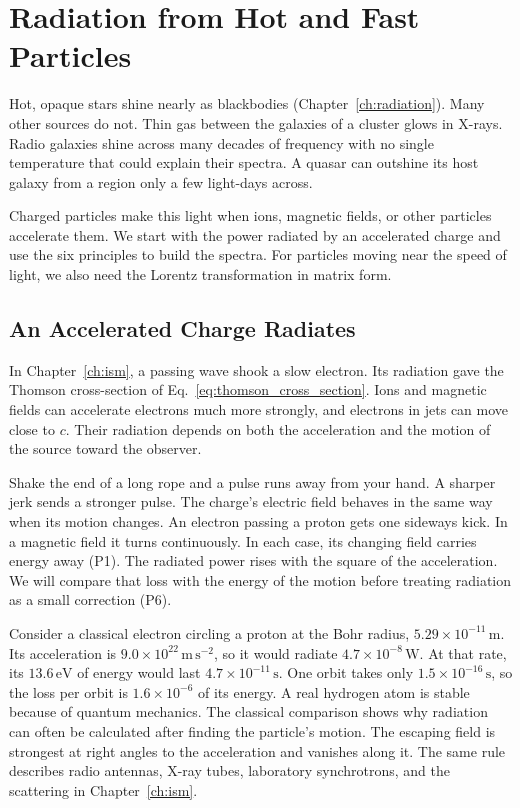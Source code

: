 \chapter{Radiation from Hot and Fast Particles}
\label{ch:fastparticles}



Hot, opaque stars shine nearly as blackbodies (Chapter~\ref{ch:radiation}). Many other sources do not. Thin gas between the galaxies of a cluster glows in X-rays. Radio galaxies shine across many decades of frequency with no single temperature that could explain their spectra. A quasar can outshine its host galaxy from a region only a few light-days across.

Charged particles make this light when ions, magnetic fields, or other particles accelerate them. We start with the power radiated by an accelerated charge and use the six principles to build the spectra. For particles moving near the speed of light, we also need the Lorentz transformation in matrix form.

\section{An Accelerated Charge Radiates}
\label{fp:sec:larmor}

In Chapter~\ref{ch:ism}, a passing wave shook a slow electron. Its radiation gave the Thomson cross-section of Eq.~\eqref{eq:thomson_cross_section}. Ions and magnetic fields can accelerate electrons much more strongly, and electrons in jets can move close to $c$. Their radiation depends on both the acceleration and the motion of the source toward the observer.

Shake the end of a long rope and a pulse runs away from your hand. A sharper jerk sends a stronger pulse. The charge's electric field behaves in the same way when its motion changes. An electron passing a proton gets one sideways kick. In a magnetic field it turns continuously. In each case, its changing field carries energy away (P1). The radiated power rises with the square of the acceleration. We will compare that loss with the energy of the motion before treating radiation as a small correction (P6).

Consider a classical electron circling a proton at the Bohr radius, $5.29\times10^{-11}\,\mathrm m$. Its acceleration is $9.0\times10^{22}\,\mathrm{m\,s^{-2}}$, so it would radiate $4.7\times10^{-8}\,\mathrm W$. At that rate, its $13.6\,\mathrm{eV}$ of energy would last $4.7\times10^{-11}\,\mathrm s$. One orbit takes only $1.5\times10^{-16}\,\mathrm s$, so the loss per orbit is $1.6\times10^{-6}$ of its energy. A real hydrogen atom is stable because of quantum mechanics. The classical comparison shows why radiation can often be calculated after finding the particle's motion. The escaping field is strongest at right angles to the acceleration and vanishes along it. The same rule describes radio antennas, X-ray tubes, laboratory synchrotrons, and the scattering in Chapter~\ref{ch:ism}.

